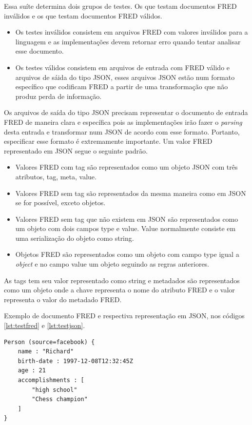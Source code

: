 Essa suíte determina dois grupos de testes. Os que testam documentos FRED inválidos
e os que testam documentos FRED válidos.

\begin{itemize}
    \item Os testes inválidos consistem em arquivos FRED com valores inválidos para a linguagem
    e as implementações devem retornar erro quando tentar analisar esse documento.
    \item Os testes válidos consistem em arquivos de entrada com FRED válido e arquivos
    de sáida do tipo JSON, esses arquivos JSON estão num formato específico que codificam
    FRED a partir de uma transformação que não produz perda de informação.
\end{itemize}

Os arquivos de saída do tipo JSON precisam representar o documento de entrada FRED de maneira
clara e específica pois as implementações irão fazer o \textit{parsing} desta entrada e transformar
num JSON de acordo com esse formato. Portanto, especificar esse formato é extremamente importante. Um valor FRED
representado em JSON segue o seguinte padrão.

\begin{itemize}
    \item Valores FRED com tag são representados como um objeto JSON com três atributos, tag, meta, value.
    \item Valores FRED sem tag são representados da mesma maneira como em JSON se for possível, exceto objetos.
    \item Valores FRED sem tag que não existem em JSON são representados como um objeto com dois campos type e value.
    Value normalmente consiste em uma serialização do objeto como string.
    \item Objetos FRED são representados como um objeto com campo type igual a \textit{object} e no campo value
    um objeto seguindo as regras anteriores.
\end{itemize}

As tags tem seu valor representado como string e metadados são representados 
como um objeto onde a chave representa o nome do atributo FRED e o valor 
representa o valor do metadado FRED.

Exemplo de documento FRED e respectiva representação em JSON, nos códigos \ref{lst:testfred}
e \ref{lst:testjson}.

\begin{lstlisting}[caption=Exemplo de FRED ,label={lst:testfred}]
Person (source=facebook) {
    name : "Richard"
    birth-date : 1997-12-08T12:32:45Z
    age : 21
    accomplishments : [
        "high school"
        "Chess champion"
    ]
}
\end{lstlisting}


